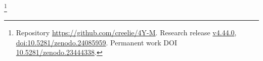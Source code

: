 \thanks{Repository \url{https://github.com/creelie/4Y-M}. Research release \href{https://github.com/creelie/4Y-M/releases/tag/v4.44.0}{v4.44.0}, \href{https://doi.org/10.5281/zenodo.24085959}{doi:10.5281/zenodo.24085959}. Permanent work DOI \href{https://doi.org/10.5281/zenodo.23444338}{10.5281/zenodo.23444338}.}
